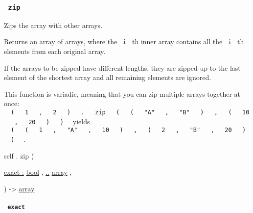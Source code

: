 \subsubsection{\texorpdfstring{\texttt{\ zip\ }}{ zip }}\label{definitions-zip}

Zips the array with other arrays.

Returns an array of arrays, where the \texttt{\ i\ } th inner array
contains all the \texttt{\ i\ } th elements from each original array.

If the arrays to be zipped have different lengths, they are zipped up to
the last element of the shortest array and all remaining elements are
ignored.

This function is variadic, meaning that you can zip multiple arrays
together at once:
\texttt{\ }{\texttt{\ (\ }}\texttt{\ }{\texttt{\ 1\ }}\texttt{\ }{\texttt{\ ,\ }}\texttt{\ }{\texttt{\ 2\ }}\texttt{\ }{\texttt{\ )\ }}\texttt{\ }{\texttt{\ .\ }}\texttt{\ }{\texttt{\ zip\ }}\texttt{\ }{\texttt{\ (\ }}\texttt{\ }{\texttt{\ (\ }}\texttt{\ }{\texttt{\ "A"\ }}\texttt{\ }{\texttt{\ ,\ }}\texttt{\ }{\texttt{\ "B"\ }}\texttt{\ }{\texttt{\ )\ }}\texttt{\ }{\texttt{\ ,\ }}\texttt{\ }{\texttt{\ (\ }}\texttt{\ }{\texttt{\ 10\ }}\texttt{\ }{\texttt{\ ,\ }}\texttt{\ }{\texttt{\ 20\ }}\texttt{\ }{\texttt{\ )\ }}\texttt{\ }{\texttt{\ )\ }}\texttt{\ }
yields
\texttt{\ }{\texttt{\ (\ }}\texttt{\ }{\texttt{\ (\ }}\texttt{\ }{\texttt{\ 1\ }}\texttt{\ }{\texttt{\ ,\ }}\texttt{\ }{\texttt{\ "A"\ }}\texttt{\ }{\texttt{\ ,\ }}\texttt{\ }{\texttt{\ 10\ }}\texttt{\ }{\texttt{\ )\ }}\texttt{\ }{\texttt{\ ,\ }}\texttt{\ }{\texttt{\ (\ }}\texttt{\ }{\texttt{\ 2\ }}\texttt{\ }{\texttt{\ ,\ }}\texttt{\ }{\texttt{\ "B"\ }}\texttt{\ }{\texttt{\ ,\ }}\texttt{\ }{\texttt{\ 20\ }}\texttt{\ }{\texttt{\ )\ }}\texttt{\ }{\texttt{\ )\ }}\texttt{\ }
.

self { . } { zip } (

{ \hyperref[definitions-zip-parameters-exact]{exact :}
\href{/docs/reference/foundations/bool/}{bool} , } {
\hyperref[definitions-zip-parameters-others]{..}
\href{/docs/reference/foundations/array/}{array} , }

) -\textgreater{} \href{/docs/reference/foundations/array/}{array}

\paragraph{\texorpdfstring{\texttt{\ exact\ }}{ exact }}\label{definitions-zip-exact}

